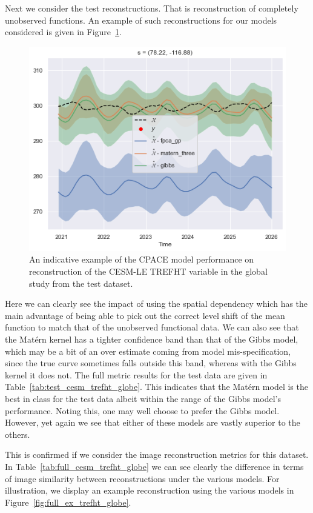 Next we consider the test reconstructions.
That is reconstruction of completely unobserved functions. 
An example of such reconstructions for our models considered is given in Figure~\ref{fig:test_ex_trefht_globe}.

\begin{figure}
	\centering
	\includegraphics[width=\textwidth]{test_ex_trefht_globe}
	\caption{An indicative example of the CPACE model performance on reconstruction of the CESM-LE TREFHT variable in the global study from the test dataset.}
	\label{fig:test_ex_trefht_globe}
\end{figure}

Here we can clearly see the impact of using the spatial dependency which has the main advantage of being able to pick out the correct level shift of the mean function to match that of the unobserved functional data. 
We can also see that the Mat\'ern kernel has a tighter confidence band than that of the Gibbs model, which may be a bit of an over estimate coming from model mis-specification, since the true curve sometimes falls outside this band, whereas with the Gibbs kernel  it does not. 
The full metric results for the test data are given in Table~\ref{tab:test_cesm_trefht_globe}. 
This indicates that the Mat\'ern model is the best in class for the test data albeit within the range of the Gibbs model's performance. 
Noting this, one may well choose to prefer the Gibbs model.
However, yet again we see that either of these models are vastly superior to the others.

This is confirmed if we consider the image reconstruction metrics for this dataset.
In Table~\ref{tab:full_cesm_trefht_globe} we can see clearly the difference in terms of image similarity between reconstructions under the various models. 
For illustration, we display an example reconstruction using the various models in Figure~\ref{fig:full_ex_trefht_globe}.

